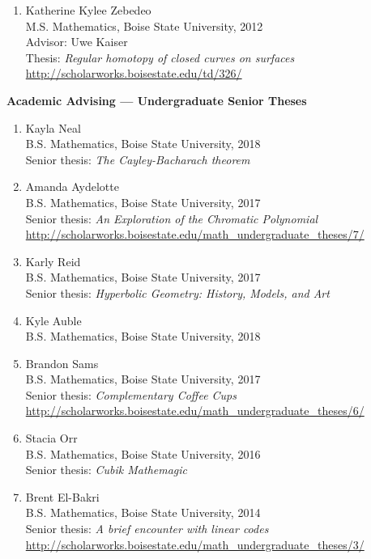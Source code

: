 \documentclass[12pt]{article}
\begin{document}
\begin{enumerate}
\item Katherine Kylee Zebedeo \\
M.S. Mathematics, Boise State University, 2012 \\
Advisor: Uwe Kaiser \\
Thesis: \emph{Regular homotopy of closed curves on surfaces} \\
\url{http://scholarworks.boisestate.edu/td/326/}
\end{enumerate}



\textbf{Academic Advising --- Undergraduate Senior Theses}
\begin{enumerate}
\item Kayla Neal \\
B.S. Mathematics, Boise State University, 2018 \\
Senior thesis: \emph{The Cayley-Bacharach theorem}

\item Amanda Aydelotte \\
B.S. Mathematics, Boise State University, 2017 \\
Senior thesis: \emph{An Exploration of the Chromatic Polynomial} \\
\url{http://scholarworks.boisestate.edu/math_undergraduate_theses/7/}

\item Karly Reid \\
B.S. Mathematics, Boise State University, 2017 \\
Senior thesis: \emph{Hyperbolic Geometry: History, Models, and Art}

\item Kyle Auble \\
B.S. Mathematics, Boise State University, 2018

\item Brandon Sams \\
B.S. Mathematics, Boise State University, 2017 \\
Senior thesis: \emph{Complementary Coffee Cups} \\
\url{http://scholarworks.boisestate.edu/math_undergraduate_theses/6/}

\item Stacia Orr \\
B.S. Mathematics, Boise State University, 2016 \\
Senior thesis: \emph{Cubik Mathemagic}

\item Brent El-Bakri \\
B.S. Mathematics, Boise State University, 2014 \\
Senior thesis: \emph{A brief encounter with linear codes} \\
\url{http://scholarworks.boisestate.edu/math_undergraduate_theses/3/}
\end{enumerate}
\end{document}
